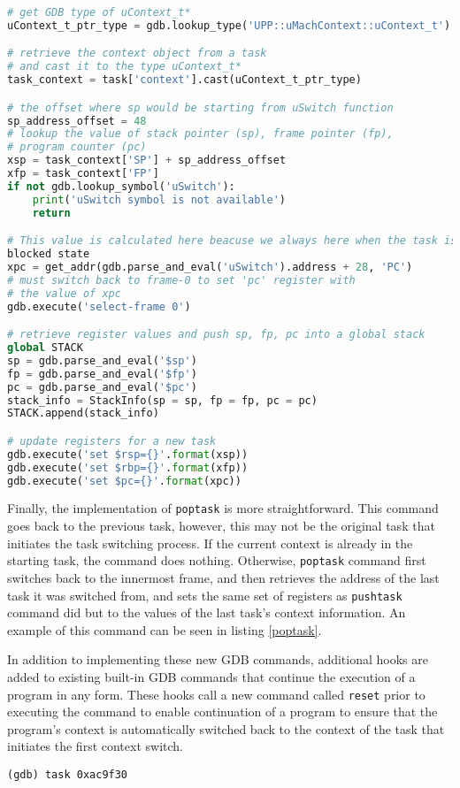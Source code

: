 \begin{lstlisting}[language=Python, caption={Abridged \text{push\_task} source
code}, label={pushtask-code}, fontstyle=\small]
# get GDB type of uContext_t*
uContext_t_ptr_type = gdb.lookup_type('UPP::uMachContext::uContext_t').pointer

# retrieve the context object from a task
# and cast it to the type uContext_t*
task_context = task['context'].cast(uContext_t_ptr_type)

# the offset where sp would be starting from uSwitch function
sp_address_offset = 48
# lookup the value of stack pointer (sp), frame pointer (fp),
# program counter (pc)
xsp = task_context['SP'] + sp_address_offset
xfp = task_context['FP']
if not gdb.lookup_symbol('uSwitch'):
    print('uSwitch symbol is not available')
    return

# This value is calculated here beacuse we always here when the task is in
blocked state
xpc = get_addr(gdb.parse_and_eval('uSwitch').address + 28, 'PC')
# must switch back to frame-0 to set 'pc' register with
# the value of xpc
gdb.execute('select-frame 0')

# retrieve register values and push sp, fp, pc into a global stack
global STACK
sp = gdb.parse_and_eval('$sp')
fp = gdb.parse_and_eval('$fp')
pc = gdb.parse_and_eval('$pc')
stack_info = StackInfo(sp = sp, fp = fp, pc = pc)
STACK.append(stack_info)

# update registers for a new task
gdb.execute('set $rsp={}'.format(xsp))
gdb.execute('set $rbp={}'.format(xfp))
gdb.execute('set $pc={}'.format(xpc))
\end{lstlisting}

Finally, the implementation of \verb|poptask| is more straightforward. This command goes back to the previous task, however, this may not be the original
task that initiates the task switching process. If the current context is
already in the starting task, the command does nothing. Otherwise,
\verb|poptask| command first switches back to the innermost frame, and then
retrieves the
address of the last task it was switched from, and sets the same set of registers as
\verb|pushtask| command did but to the values of the last task's context
information. An example of this command can be seen in listing \ref{poptask}.

In addition to implementing these new GDB commands, additional hooks are added
to existing built-in GDB commands that continue the execution of a program in any form. These hooks
call a new command called \verb|reset| prior to executing the command to enable
continuation of a program to ensure that
the program's context is automatically switched back to the context of the task
that initiates the first
context switch.
\begin{lstlisting}[caption={\text{pushtask} command}, label={pushtask}]
(gdb) task 0xac9f30
\end{lstlisting}

